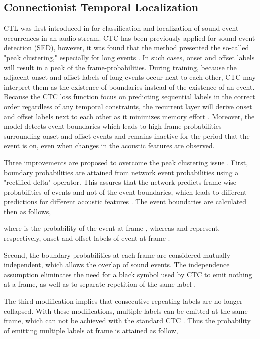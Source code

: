 \documentclass[a4paper]{article}
\begin{document}
\subsection{Connectionist Temporal Localization}
\label{subsec:ctl}

CTL was first introduced in \cite{wang2019connectionist} for classification and localization of sound event occurrences in an audio stream. CTC has been previously applied for sound event detection (SED), however, it was found that the method presented the so-called "peak clustering," especially for long events \cite{wang2017first}. In such cases, onset and offset labels will result in a peak of the frame-probabilities. During training, because the adjacent onset and offset labels of long events occur next to each other, CTC may interpret them as the existence of boundaries instead of the existence of an event. Because the CTC loss function focus on predicting sequential labels in the correct order regardless of any temporal constraints, the recurrent layer will derive onset and offset labels next to each other as it minimizes memory effort \cite{wang2019connectionist}. Moreover, the model detects event boundaries which leads to high frame-probabilities surrounding onset and offset events and remains inactive for the period that the event is on, even when changes in the acoustic features are observed. 


Three improvements are proposed to overcome the peak clustering issue \cite{wang2019connectionist}. First, boundary probabilities are attained from network event probabilities using a "rectified delta" operator. This assures that the network predicts
frame-wise probabilities of events and not
of the event boundaries, which leads to
different predictions for different acoustic features \cite{wang2019connectionist}. The event boundaries are calculated then as follows,



\noindent where  is the probability of the event  at frame , whereas  and  represent, respectively, onset and offset labels of event  at frame .

Second, the boundary probabilities at each frame are considered mutually independent, which allows the overlap of sound events. The independence assumption eliminates the need for a black symbol used by CTC to emit nothing at a frame, as well as to separate repetition of the same label \cite{wang2019connectionist}. 

The third modification implies that consecutive repeating labels are no longer collapsed. With these modifications, multiple labels can be emitted at the same frame, which can not be achieved with the standard CTC \cite{wang2019connectionist}. Thus the probability of emitting multiple labels at frame  is attained as follow, 
\end{document}

